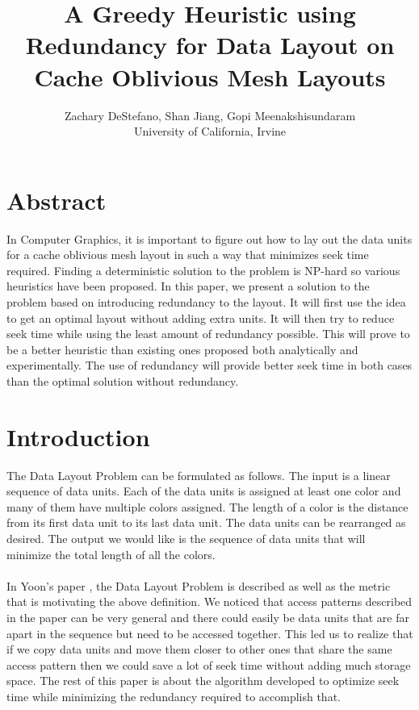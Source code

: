 \documentclass[11pt,psfig]{article}
\begin{document}
\setlength{\parskip}{1.2ex plus0.3ex minus 0.3ex}


\thispagestyle{empty} \pagestyle{myheadings} 



\title{A Greedy Heuristic using Redundancy for Data Layout on Cache Oblivious Mesh Layouts}
\author{Zachary DeStefano, Shan Jiang, Gopi Meenakshisundaram\\ University of California, Irvine}

\maketitle

\vfill\eject

\section*{Abstract}

In Computer Graphics, it is important to figure out how to lay out the data units for a cache oblivious mesh layout in such a way that minimizes seek time required. Finding a deterministic solution to the problem is NP-hard so various heuristics have been proposed. In this paper, we present a solution to the problem based on introducing redundancy to the layout. It will first use the idea to get an optimal layout without adding extra units. It will then try to reduce seek time while using the least amount of redundancy possible. This will prove to be a better heuristic than existing ones proposed both analytically and experimentally. The use of redundancy will provide better seek time in both cases than the optimal solution without redundancy.  

\section*{Introduction}

The Data Layout Problem can be formulated as follows. The input is a linear sequence of data units. Each of the data units is assigned at least one color and many of them have multiple colors assigned. The length of a color is the distance from its first data unit to its last data unit. The data units can be rearranged as desired. The output we would like is the sequence of data units that will minimize the total length of all the colors. \\
\\
In Yoon's paper \cite{cacheobliviouslayout}, the Data Layout Problem is described as well as the metric that is motivating the above definition. We noticed that access patterns described in the paper can be very general and there could easily be data units that are far apart in the sequence but need to be accessed together. This led us to realize that if we copy data units and move them closer to other ones that share the same access pattern then we could save a lot of seek time without adding much storage space. The rest of this paper is about the algorithm developed to optimize seek time while minimizing the redundancy required to accomplish that. 
\end{document}

